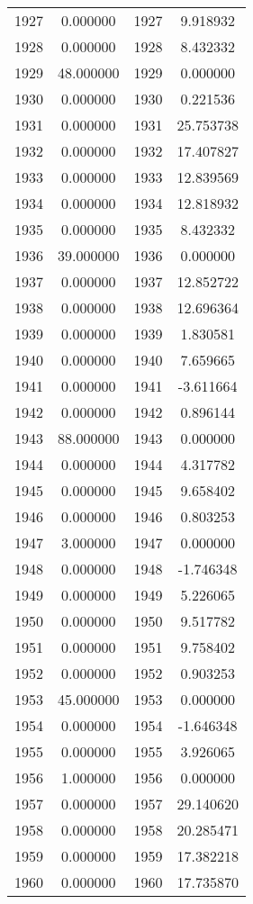 \documentclass[12pt]{article}
\begin{document}
\begin{longtable}{@{}cccc@{}}
1927 & 0.000000 & 1927 & 9.918932 \\
1928 & 0.000000 & 1928 & 8.432332 \\
1929 & 48.000000 & 1929 & 0.000000 \\
1930 & 0.000000 & 1930 & 0.221536 \\
1931 & 0.000000 & 1931 & 25.753738 \\
1932 & 0.000000 & 1932 & 17.407827 \\
1933 & 0.000000 & 1933 & 12.839569 \\
1934 & 0.000000 & 1934 & 12.818932 \\
1935 & 0.000000 & 1935 & 8.432332 \\
1936 & 39.000000 & 1936 & 0.000000 \\
1937 & 0.000000 & 1937 & 12.852722 \\
1938 & 0.000000 & 1938 & 12.696364 \\
1939 & 0.000000 & 1939 & 1.830581 \\
1940 & 0.000000 & 1940 & 7.659665 \\
1941 & 0.000000 & 1941 & -3.611664 \\
1942 & 0.000000 & 1942 & 0.896144 \\
1943 & 88.000000 & 1943 & 0.000000 \\
1944 & 0.000000 & 1944 & 4.317782 \\
1945 & 0.000000 & 1945 & 9.658402 \\
1946 & 0.000000 & 1946 & 0.803253 \\
1947 & 3.000000 & 1947 & 0.000000 \\
1948 & 0.000000 & 1948 & -1.746348 \\
1949 & 0.000000 & 1949 & 5.226065 \\
1950 & 0.000000 & 1950 & 9.517782 \\
1951 & 0.000000 & 1951 & 9.758402 \\
1952 & 0.000000 & 1952 & 0.903253 \\
1953 & 45.000000 & 1953 & 0.000000 \\
1954 & 0.000000 & 1954 & -1.646348 \\
1955 & 0.000000 & 1955 & 3.926065 \\
1956 & 1.000000 & 1956 & 0.000000 \\
1957 & 0.000000 & 1957 & 29.140620 \\
1958 & 0.000000 & 1958 & 20.285471 \\
1959 & 0.000000 & 1959 & 17.382218 \\
1960 & 0.000000 & 1960 & 17.735870 \\

\end{longtable}
\end{document}
